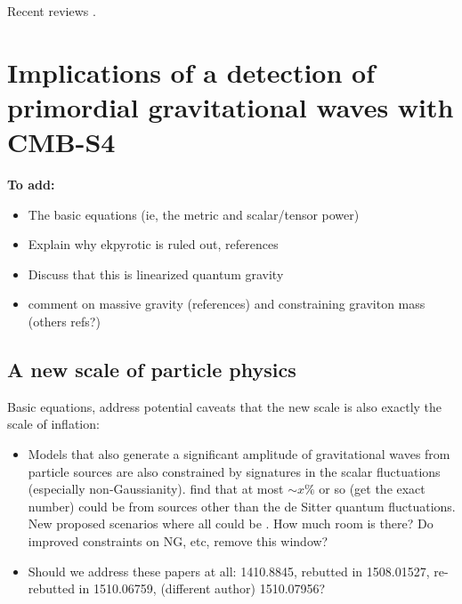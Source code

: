 Recent reviews \cite{Kamionkowski:2015yta}.

\section{Implications of a detection of primordial gravitational waves with CMB-S4}

{\bf To add:}
\begin{itemize}
\item The basic equations (ie, the metric and scalar/tensor power)
\item Explain why ekpyrotic is ruled out, references
\item Discuss that this is linearized quantum gravity
\item comment on massive gravity (references) and constraining graviton mass \cite{Bessada:2009qw,Dubovsky:2009xk,Bessada:2009np} (others refs?)
\end{itemize}

\subsection{A new scale of particle physics}
Basic equations, address potential caveats that the new scale is also exactly the scale of inflation:

\begin{itemize}
\item Models that also generate a significant amplitude of gravitational waves from particle sources are also constrained by signatures in the scalar fluctuations (especially non-Gaussianity). \cite{Mirbabayi:2014jqa, Ozsoy:2014sba} find that at most $\sim x\%$ or so (get the exact number) could be from sources other than the de Sitter quantum fluctuations. New proposed scenarios where all could be  \cite{Namba:2015gja}. How much room is there? Do improved constraints on NG, etc, remove this window?
\item Should we address these papers at all: 1410.8845, rebutted in 1508.01527, re-rebutted in 1510.06759, (different author) 1510.07956?
\end{itemize}

